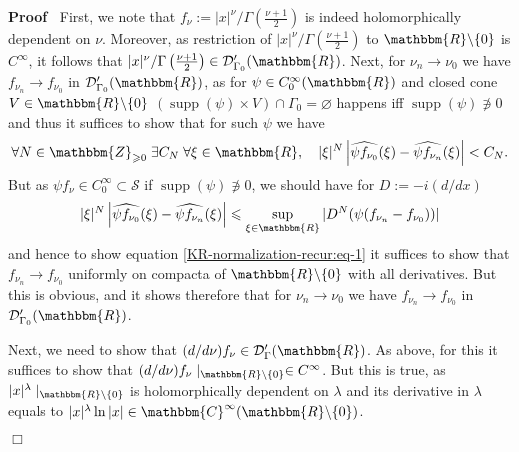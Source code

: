\documentclass{article}
\newcommand{\nni}{\not\ni}
\newcommand{\assign}{:=}
\newcommand{\tmop}[1]{\ensuremath{\operatorname{#1}}}
\renewenvironment{proof}{\noindent\textbf{Proof\ }}{\hspace*{\fill}$\Box$\medskip}
\theoremstyle{remark}
\begin{document}
\begin{proof}
  First, we note that $f_{\nu} \assign | x |^{\nu} / \Gamma \left( \frac{\nu +
  1}{2} \right)$ is indeed holomorphically dependent on $\nu$. Moreover, as
  restriction of $| x |^{\nu} / \Gamma \left( \frac{\nu + 1}{2} \right)$ to
  $\mathbbm{R}\backslash \{ 0 \}$ is $C^{\infty}$, it follows that $| x
  |^{\nu} / \Gamma \left( \frac{\nu + 1}{2} \right) \in
  \mathcal{D}'_{\Gamma_0} (\mathbbm{R})$. Next, for $\nu_n \rightarrow \nu_0$
  we have $f_{\nu_n} \rightarrow f_{\nu_0}$ in $\mathcal{D}'_{\Gamma_0}
  (\mathbbm{R})$, as for $\psi \in C^{\infty}_0 (\mathbbm{R})$ and closed cone
  $V \in \mathbbm{R}\backslash \{ 0 \}$ $(\tmop{supp} (\psi) \times V) \cap
  \Gamma_0 = \varnothing$ happens iff $\tmop{supp} (\psi) \nni 0$ and thus it
  suffices to show that for such $\psi$ we have
  \begin{equation}
    \forall N \in \mathbbm{Z}_{\geqslant 0} \; \exists C_N \; \forall \xi \in
    \mathbbm{R}, \quad | \xi |^N \left| \widehat{\psi f_{\nu_0}} (\xi) -
    \widehat{\psi f_{\nu_n}} (\xi) \right| < C_N .
    \label{KR-normalization-recur:eq-1}
  \end{equation}
  But as $\psi f_{\nu} \in C^{\infty}_0 \subset \mathcal{S}$ if $\tmop{supp}
  (\psi) \nni 0$, we should have for $D \assign - i (d / d x)$
  \[ | \xi |^N \left| \widehat{\psi f_{\nu_0}} (\xi) - \widehat{\psi
     f_{\nu_n}} (\xi) \right| \leqslant \sup_{\xi \in \mathbbm{R}} | D^N (\psi
     (f_{\nu_n} - f_{\nu_0})) | \]
  and hence to show equation \ref{KR-normalization-recur:eq-1} it suffices to
  show that $f_{\nu_n} \rightarrow f_{\nu_0}$ uniformly on compacta of
  $\mathbbm{R}\backslash \{ 0 \}$ with all derivatives. But this is obvious,
  and it shows therefore that for $\nu_n \rightarrow \nu_0$ we have $f_{\nu_n}
  \rightarrow f_{\nu_0}$ in $\mathcal{D}'_{\Gamma_0} (\mathbbm{R})$.
  
  Next, we need to show that $(d / d \nu) f_{\nu} \in \mathcal{D}'_{\Gamma}
  (\mathbbm{R})$. As above, for this it suffices to show that $(d / d \nu)
  f_{\nu} \mid_{\mathbbm{R}\backslash \{ 0 \}} \in C^{\infty}$. But this
  is true, as $| x |^{\lambda} \mid_{\mathbbm{R}\backslash \{ 0 \}}$ is
  holomorphically dependent on $\lambda$ and its derivative in $\lambda$
  equals to $| x |^{\lambda} \ln | x | \in \mathbbm{C}^{\infty}
  (\mathbbm{R}\backslash \{ 0 \})$.
  

\end{proof}
\end{document}
